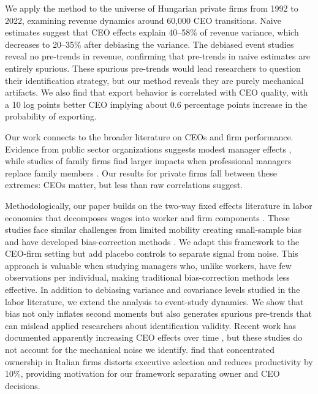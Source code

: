 \documentclass[11pt,a4paper]{article}
\begin{document}
We apply the method to the universe of Hungarian private firms from 1992 to 2022, examining revenue dynamics around 60,000 CEO transitions. Naive estimates suggest that CEO effects explain 40--58\% of revenue variance, which decreases to 20--35\% after debiasing the variance. The debiased event studies reveal no pre-trends in revenue, confirming that pre-trends in naive estimates are entirely spurious. These spurious pre-trends would lead researchers to question their identification strategy, but our method reveals they are purely mechanical artifacts. We also find that export behavior is correlated with CEO quality, with a 10 log points better CEO implying about 0.6 percentage points increase in the probability of exporting.


Our work connects to the broader literature on CEOs and firm performance. Evidence from public sector organizations suggests modest manager effects \citep{fenizia2022managers, janke2024role}, while studies of family firms find larger impacts when professional managers replace family members \citep{bennedsen2007inside, sraer2007performance}. Our results for private firms fall between these extremes: CEOs matter, but less than raw correlations suggest.

Methodologically, our paper builds on the two-way fixed effects literature in labor economics that decomposes wages into worker and firm components \citep{Abowd1999Econometrica, Card2018JoLE}. These studies face similar challenges from limited mobility creating small-sample bias \citep{andrews2008high} and have developed bias-correction methods \citep{Bonhomme2023-dx, gaure2014correlation}. We adapt this framework to the CEO-firm setting but add placebo controls to separate signal from noise. This approach is valuable when studying managers who, unlike workers, have few observations per individual, making traditional bias-correction methods less effective. In addition to debiasing variance and covariance levels studied in the labor literature, we extend the analysis to event-study dynamics. We show that bias not only inflates second moments but also generates spurious pre-trends that can mislead applied researchers about identification validity. Recent work has documented apparently increasing CEO effects over time \citep{quigley2015has}, but these studies do not account for the mechanical noise we identify. \citet{lippi2014corporate} find that concentrated ownership in Italian firms distorts executive selection and reduces productivity by 10\%, providing motivation for our framework separating owner and CEO decisions.
\end{document}
